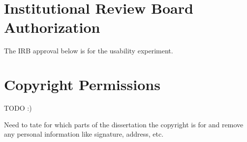 \chapter{Institutional Review Board Authorization}\label{anx:IRB}

The IRB approval below is for the usability experiment.


\chapter{Copyright Permissions}

TODO :)

Need to tate for which parts of the dissertation the copyright is for and remove any personal information like signature, address, etc. 
